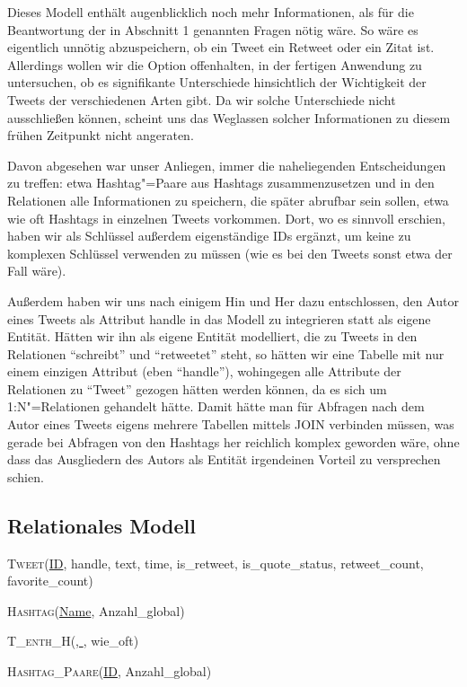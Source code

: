\documentclass[BCOR0mm,fontsize=12pt,paper=a4,final,numbers=noenddot]{scrartcl}
\begin{document}
\noindent{}Dieses Modell enthält augenblicklich noch mehr Informationen, als für die Beantwortung der in Abschnitt 1 genannten Fragen nötig wäre. So wäre es eigentlich unnötig abzuspeichern, ob ein Tweet ein Retweet oder ein Zitat ist. Allerdings wollen wir die Option offenhalten, in der fertigen Anwendung zu untersuchen, ob es signifikante Unterschiede hinsichtlich der Wichtigkeit der Tweets der verschiedenen Arten gibt. Da wir solche Unterschiede nicht ausschließen können, scheint uns das Weglassen solcher Informationen zu diesem frühen Zeitpunkt nicht angeraten.

Davon abgesehen war unser Anliegen, immer die naheliegenden Entscheidungen zu treffen: etwa Hashtag"=Paare aus Hashtags zusammenzusetzen und in den Relationen alle Informationen zu speichern, die später abrufbar sein sollen, etwa wie oft Hashtags in einzelnen Tweets vorkommen. Dort, wo es sinnvoll erschien, haben wir als Schlüssel außerdem eigenständige IDs ergänzt, um keine zu komplexen Schlüssel verwenden zu müssen (wie es bei den Tweets sonst etwa der Fall wäre).

Außerdem haben wir uns nach einigem Hin und Her dazu entschlossen, den Autor eines Tweets als Attribut handle in das Modell zu integrieren statt als eigene Entität. Hätten wir ihn als eigene Entität modelliert, die zu Tweets in den Relationen "`schreibt"' und "`retweetet"' steht, so hätten wir eine Tabelle mit nur einem einzigen Attribut (eben "`handle"'), wohingegen alle Attribute der Relationen zu "`Tweet"' gezogen hätten werden können, da es sich um 1:N"=Relationen gehandelt hätte. Damit hätte man für Abfragen nach dem Autor eines Tweets eigens mehrere Tabellen mittels JOIN verbinden müssen, was gerade bei Abfragen von den Hashtags her reichlich komplex geworden wäre, ohne dass das Ausgliedern des Autors als Entität irgendeinen Vorteil zu versprechen schien.


\subsection{Relationales Modell}

\noindent\textsc{Tweet}(\uline{ID}, handle, text, time, is\_retweet, is\_quote\_status, retweet\_count, favorite\_count)

\noindent\textsc{Hashtag}(\uline{Name}, Anzahl\_global)

\noindent\textsc{T\_enth\_H}(\uline{, }, wie\_oft)

\noindent\textsc{Hashtag\_Paare}(\uline{ID}, Anzahl\_global)
\end{document}

